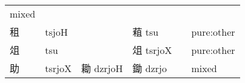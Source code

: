 \documentclass[14pt,a4paper]{scrartcl}
\begin{document}
\begin{longtable}[c]{@{}llllll@{}}
\begin{minipage}[t]{0.14\columnwidth}\raggedright\strut
mixed
\strut\end{minipage}\tabularnewline
\begin{minipage}[t]{0.14\columnwidth}\raggedright\strut
租
\strut\end{minipage} &
\begin{minipage}[t]{0.14\columnwidth}\raggedright\strut
tsjoH
\strut\end{minipage} &
\begin{minipage}[t]{0.14\columnwidth}\raggedright\strut
\strut\end{minipage} &
\begin{minipage}[t]{0.14\columnwidth}\raggedright\strut
蒩 tsu
\strut\end{minipage} &
\begin{minipage}[t]{0.14\columnwidth}\raggedright\strut
\strut\end{minipage} &
\begin{minipage}[t]{0.14\columnwidth}\raggedright\strut
pure:other
\strut\end{minipage}\tabularnewline
\begin{minipage}[t]{0.14\columnwidth}\raggedright\strut
俎
\strut\end{minipage} &
\begin{minipage}[t]{0.14\columnwidth}\raggedright\strut
tsu
\strut\end{minipage} &
\begin{minipage}[t]{0.14\columnwidth}\raggedright\strut
\strut\end{minipage} &
\begin{minipage}[t]{0.14\columnwidth}\raggedright\strut
俎 tsrjoX
\strut\end{minipage} &
\begin{minipage}[t]{0.14\columnwidth}\raggedright\strut
\strut\end{minipage} &
\begin{minipage}[t]{0.14\columnwidth}\raggedright\strut
pure:other
\strut\end{minipage}\tabularnewline
\begin{minipage}[t]{0.14\columnwidth}\raggedright\strut
助
\strut\end{minipage} &
\begin{minipage}[t]{0.14\columnwidth}\raggedright\strut
tsrjoX
\strut\end{minipage} &
\begin{minipage}[t]{0.14\columnwidth}\raggedright\strut
耡 dzrjoH
\strut\end{minipage} &
\begin{minipage}[t]{0.14\columnwidth}\raggedright\strut
鋤 dzrjo
\strut\end{minipage} &
\begin{minipage}[t]{0.14\columnwidth}\raggedright\strut
\strut\end{minipage} &
\begin{minipage}[t]{0.14\columnwidth}\raggedright\strut
mixed
\strut\end{minipage}\tabularnewline
\bottomrule
\end{longtable}
\end{document}

